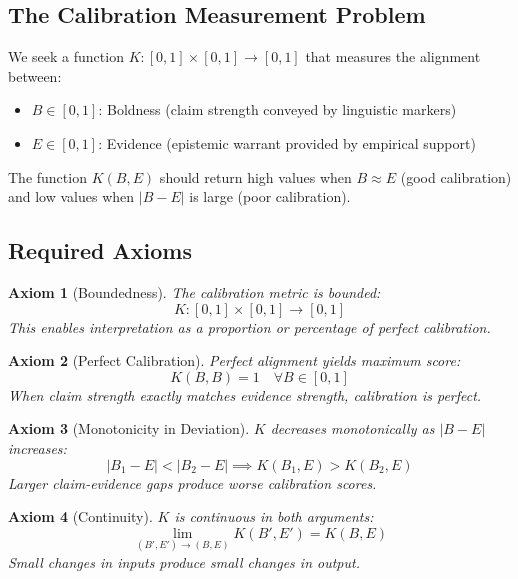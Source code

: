 \documentclass[11pt,a4paper]{article}
\newtheorem{axiom}{Axiom}[section]
\theoremstyle{remark}
\begin{document}
\subsection{The Calibration Measurement Problem}

We seek a function $K: [0,1] \times [0,1] \to [0,1]$ that measures the alignment between:
\begin{itemize}
    \item $B \in [0,1]$: Boldness (claim strength conveyed by linguistic markers)
    \item $E \in [0,1]$: Evidence (epistemic warrant provided by empirical support)
\end{itemize}

The function $K(B, E)$ should return high values when $B \approx E$ (good calibration) and low values when $|B - E|$ is large (poor calibration).

\subsection{Required Axioms}

\begin{axiom}[Boundedness]
\label{ax:bounded}
The calibration metric is bounded:
\begin{equation}
K: [0,1] \times [0,1] \to [0,1]
\end{equation}
This enables interpretation as a proportion or percentage of perfect calibration.
\end{axiom}

\begin{axiom}[Perfect Calibration]
\label{ax:perfect}
Perfect alignment yields maximum score:
\begin{equation}
K(B, B) = 1 \quad \forall B \in [0,1]
\end{equation}
When claim strength exactly matches evidence strength, calibration is perfect.
\end{axiom}

\begin{axiom}[Monotonicity in Deviation]
\label{ax:monotone}
$K$ decreases monotonically as $|B - E|$ increases:
\begin{equation}
|B_1 - E| < |B_2 - E| \implies K(B_1, E) > K(B_2, E)
\end{equation}
Larger claim-evidence gaps produce worse calibration scores.
\end{axiom}

\begin{axiom}[Continuity]
\label{ax:continuous}
$K$ is continuous in both arguments:
\begin{equation}
\lim_{(B', E') \to (B, E)} K(B', E') = K(B, E)
\end{equation}
Small changes in inputs produce small changes in output.
\end{axiom}
\end{document}

